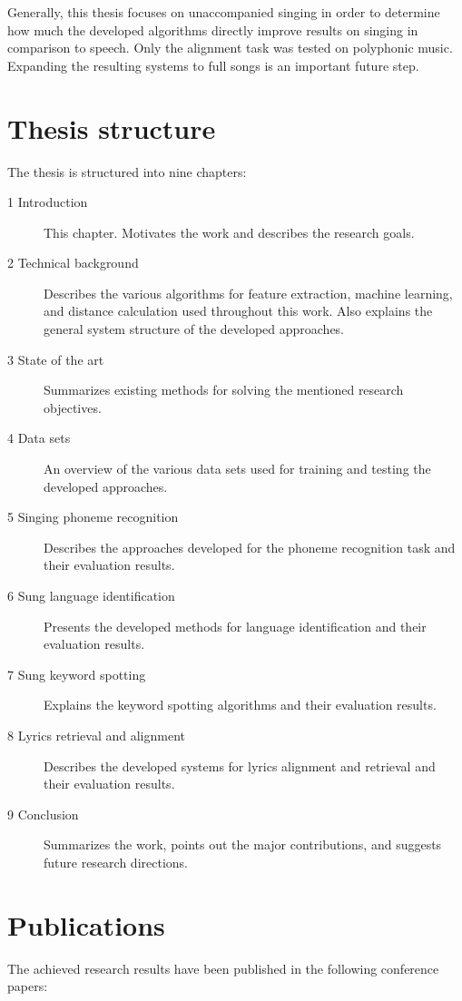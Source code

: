 Generally, this thesis focuses on unaccompanied singing in order to determine how much the developed algorithms directly improve results on singing in comparison to speech. Only the alignment task was tested on polyphonic music. Expanding the resulting systems to full songs is an important future step.

\section{Thesis structure}
The thesis is structured into nine chapters:
\begin{description}
\item[1 Introduction] This chapter. Motivates the work and describes the research goals.
\item[2 Technical background] Describes the various algorithms for feature extraction, machine learning, and distance calculation used throughout this work. Also explains the general system structure of the developed approaches.
\item[3 State of the art] Summarizes existing methods for solving the mentioned research objectives.
\item[4 Data sets] An overview of the various data sets used for training and testing the developed approaches.
\item[5 Singing phoneme recognition] Describes the approaches developed for the phoneme recognition task and their evaluation results.
\item[6 Sung language identification] Presents the developed methods for language identification and their evaluation results.
\item[7 Sung keyword spotting] Explains the keyword spotting algorithms and their evaluation results.
\item[8 Lyrics retrieval and alignment] Describes the developed systems for lyrics alignment and retrieval and their evaluation results.
\item[9 Conclusion] Summarizes the work, points out the major contributions, and suggests future research directions.
\end{description}


\section{Publications}
The achieved research results have been published in the following conference papers:

